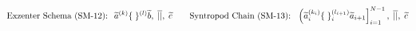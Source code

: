 \documentclass[preview]{standalone}
\begin{document}
\begin{align*}
\special{dvisvgm:raw <g id='unique000'>}\text{Exzenter Schema (SM-12): }\; \widetilde{a}^{(k)}\{\;\}^{(l)}\widetilde{b},\;\overline{||},\;\widetilde{c} \qquad\text{Syntropod Chain (SM-13): }\; \left(\widetilde{a}_i^{(k_i)}\{\;\}_i^{(l_{i+1})}\widetilde{a}_{i+1}\right]_{i=1}^{N-1},\;\overline{||},\;\widetilde{c}\special{dvisvgm:raw </g>}
\end{align*}
\end{document}
